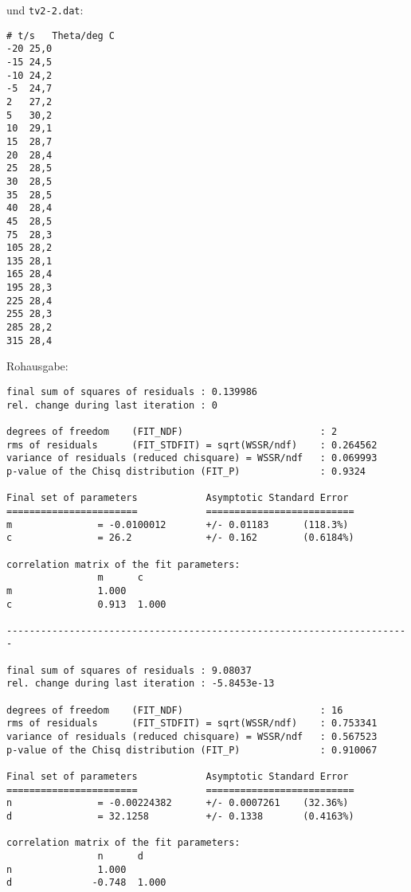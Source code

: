     und \texttt{tv2-2.dat}:
    \begin{multicols}{3}
        \begin{verbatim}
# t/s   Theta/deg C
-20 25,0
-15 24,5
-10 24,2
-5  24,7
2   27,2
5   30,2
10  29,1
15  28,7
20  28,4
25  28,5
30  28,5
35  28,5
40  28,4
45  28,5
75  28,3
105 28,2
135 28,1
165 28,4
195 28,3
225 28,4
255 28,3
285 28,2
315 28,4
        \end{verbatim}
    \end{multicols}

    Rohausgabe:
    \begin{verbatim}
final sum of squares of residuals : 0.139986
rel. change during last iteration : 0

degrees of freedom    (FIT_NDF)                        : 2
rms of residuals      (FIT_STDFIT) = sqrt(WSSR/ndf)    : 0.264562
variance of residuals (reduced chisquare) = WSSR/ndf   : 0.069993
p-value of the Chisq distribution (FIT_P)              : 0.9324

Final set of parameters            Asymptotic Standard Error
=======================            ==========================
m               = -0.0100012       +/- 0.01183      (118.3%)
c               = 26.2             +/- 0.162        (0.6184%)

correlation matrix of the fit parameters:
                m      c      
m               1.000 
c               0.913  1.000 

-----------------------------------------------------------------------

final sum of squares of residuals : 9.08037
rel. change during last iteration : -5.8453e-13

degrees of freedom    (FIT_NDF)                        : 16
rms of residuals      (FIT_STDFIT) = sqrt(WSSR/ndf)    : 0.753341
variance of residuals (reduced chisquare) = WSSR/ndf   : 0.567523
p-value of the Chisq distribution (FIT_P)              : 0.910067

Final set of parameters            Asymptotic Standard Error
=======================            ==========================
n               = -0.00224382      +/- 0.0007261    (32.36%)
d               = 32.1258          +/- 0.1338       (0.4163%)

correlation matrix of the fit parameters:
                n      d      
n               1.000 
d              -0.748  1.000 


\end{verbatim}
